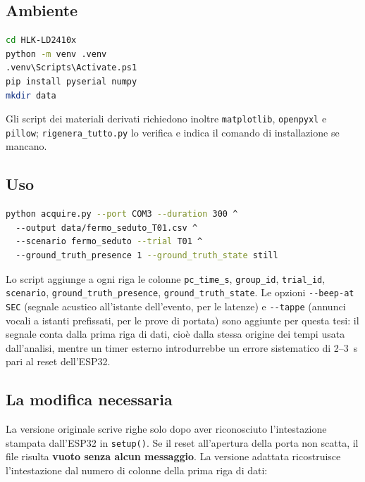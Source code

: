 \subsection{Ambiente}

\begin{lstlisting}[language=bash,caption={Preparazione dell'ambiente Python.},
basicstyle=\ttfamily\scriptsize]
cd HLK-LD2410x
python -m venv .venv
.venv\Scripts\Activate.ps1
pip install pyserial numpy
mkdir data
\end{lstlisting}

Gli script dei materiali derivati richiedono inoltre \texttt{matplotlib},
\texttt{openpyxl} e \texttt{pillow}; \texttt{rigenera\_tutto.py} lo verifica e indica
il comando di installazione se mancano.

\subsection{Uso}

\begin{lstlisting}[language=bash,caption={Esempio di acquisizione di un trial.},
basicstyle=\ttfamily\scriptsize]
python acquire.py --port COM3 --duration 300 ^
  --output data/fermo_seduto_T01.csv ^
  --scenario fermo_seduto --trial T01 ^
  --ground_truth_presence 1 --ground_truth_state still
\end{lstlisting}

Lo script aggiunge a ogni riga le colonne \texttt{pc\_time\_s},
\texttt{group\_id}, \texttt{trial\_id}, \texttt{scenario},
\texttt{ground\_truth\_presence}, \texttt{ground\_truth\_state}. Le opzioni
\texttt{-{}-beep-at SEC} (segnale acustico all'istante dell'evento, per le latenze)
e \texttt{-{}-tappe} (annunci vocali a istanti prefissati, per le prove di portata)
sono aggiunte per questa tesi: il segnale conta dalla prima riga di dati, cioè dalla
stessa origine dei tempi usata dall'analisi, mentre un timer esterno introdurrebbe
un errore sistematico di 2--3~s pari al reset dell'ESP32.

\subsection{La modifica necessaria}

La versione originale scrive righe solo dopo aver riconosciuto l'intestazione
stampata dall'ESP32 in \texttt{setup()}. Se il reset all'apertura della porta non
scatta, il file risulta \textbf{vuoto senza alcun messaggio}. La versione adattata
ricostruisce l'intestazione dal numero di colonne della prima riga di dati:

